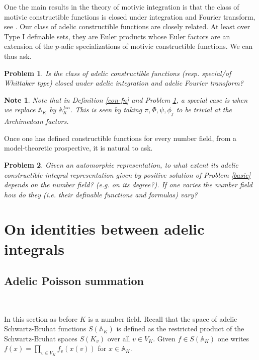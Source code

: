 \documentclass[12pt]{amsart}
\def\A{\mathbb{A}}
\numberwithin{equation}{section}
\newtheorem{prob}{Problem}[section]
\newtheorem{note}{Note}[section]
\begin{document}
One the main results in the theory of motivic integration is that the class of motivic constructible functions is closed under integration and Fourier transform, see \cite{CL2}. Our class of adelic constructible functions are closely related. At least over 
Type I definable sets, they are Euler products whose Euler factors are an extension of the $p$-adic specializations of motivic constructible functions. We can thus ask.

\begin{prob}\label{closed} Is the class of adelic constructible functions (resp. special/of Whittaker type) closed under adelic integration and adelic Fourier transform?
\end{prob}

\begin{note} Note that in Definition \ref{con-fn} and Problem \ref{closed}, a special case is when 
we replace $\A_K$ by $\A_K^{fin}$. This is seen by taking $\pi,\Phi,\psi,\phi_j$ to be trivial at the 
Archimedean factors.\end{note}

Once one has defined constructible functions for every number field, from a model-theoretic prospective, it is natural to ask.

\begin{prob} Given an automorphic representation, to what extent its adelic constructible integral representation given by positive solution of Problem \ref{basic} depends on the number field? (e.g. on its degree?). 
If one varies the number field how do they (i.e. their definable functions and formulas) vary?\end{prob}



\section{\bf On identities between adelic integrals}

\medskip

\subsection{\bf Adelic Poisson summation}\label{ssec-poisson}

\

\medskip

In this section as before $K$ is a number field. 
Recall that the space of adelic Schwartz-Bruhat functions $S(\A_K)$ is defined as the restricted product of the Schwartz-Bruhat spaces $S(K_v)$ over all $v\in V_K$. Given $f\in S(\A_K)$ one writes $f(x)=\prod_{v\in V_K} f_v(x(v))$ for $x\in \A_K$. 
\end{document}
